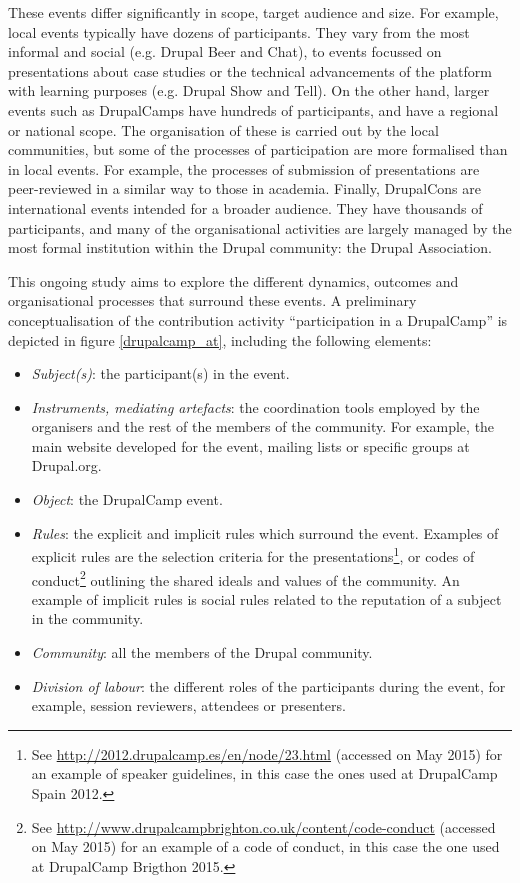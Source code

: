 \documentclass[a4paper, 12pt]{article}
\begin{document}
These events differ significantly in scope, target audience and size. For example, local events typically have dozens of participants. They vary from the most informal and social (e.g. Drupal Beer and Chat), to events focussed on presentations about case studies or the technical advancements of the platform with learning purposes (e.g. Drupal Show and Tell). On the other hand, larger events such as DrupalCamps have hundreds of participants, and have a regional or national scope. The organisation of these is carried out by the local communities, but some of the processes of participation are more formalised than in local events. For example, the processes of submission of presentations are peer-reviewed in a similar way to those in academia. Finally, DrupalCons are international events intended for a broader audience. They have thousands of participants, and many of the organisational activities are largely managed by the most formal institution within the Drupal community: the Drupal Association.

This ongoing study aims to explore the different dynamics, outcomes and organisational processes that surround these events. 
A preliminary conceptualisation of the contribution activity ``participation in a DrupalCamp'' is depicted in figure \ref{drupalcamp_at}, including the following elements:

\begin{itemize}
	\item \textit{Subject(s)}: the participant(s) in the event.
	\item \textit{Instruments, mediating artefacts}: the coordination tools employed by the organisers and the rest of the members of the community. For example, the main website developed for the event, mailing lists or specific groups at Drupal.org.	
	\item \textit{Object}: the DrupalCamp event.
	\item \textit{Rules}: the explicit and implicit rules which surround the event. Examples of explicit rules are the selection criteria for the presentations\footnote{See \url{http://2012.drupalcamp.es/en/node/23.html} (accessed on  May 2015) for an example of speaker guidelines, in this case the ones used at DrupalCamp Spain 2012.}, or codes of conduct\footnote{See \url{http://www.drupalcampbrighton.co.uk/content/code-conduct} (accessed on  May 2015) for an example of a code of conduct, in this case the one used at DrupalCamp Brigthon 2015.} outlining the shared ideals and values of the community. An example of implicit rules is social rules related to the reputation of a subject in the community.
	\item \textit{Community}: all the members of the Drupal community.
	\item \textit{Division of labour}: the different roles of the participants during the event, for example, session reviewers, attendees or presenters.
\end{itemize}
\end{document}
